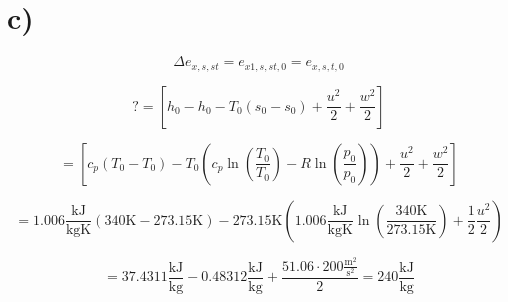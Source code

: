 

\section*{c)}

\[
\Delta e_{x,s,st} = e_{x1,s,st,0} = e_{x,s,t,0}
\]

\[
? = \left[ h_0 - h_0 - T_0 \left( s_0 - s_0 \right) + \frac{u^2}{2} + \frac{w^2}{2} \right]
\]

\[
= \left[ c_p \left( T_0 - T_0 \right) - T_0 \left( c_p \ln \left( \frac{T_0}{T_0} \right) - R \ln \left( \frac{p_0}{p_0} \right) \right) + \frac{u^2}{2} + \frac{w^2}{2} \right]
\]

\[
= 1.006 \frac{\text{kJ}}{\text{kgK}} \left( 340 \text{K} - 273.15 \text{K} \right) - 273.15 \text{K} \left( 1.006 \frac{\text{kJ}}{\text{kgK}} \ln \left( \frac{340 \text{K}}{273.15 \text{K}} \right) + \frac{1}{2} \frac{u^2}{2} \right)
\]

\[
= 37.4311 \frac{\text{kJ}}{\text{kg}} - 0.48312 \frac{\text{kJ}}{\text{kg}} + \frac{51.06 \cdot 200 \frac{\text{m}^2}{\text{s}^2}}{2} = 240 \frac{\text{kJ}}{\text{kg}}
\]